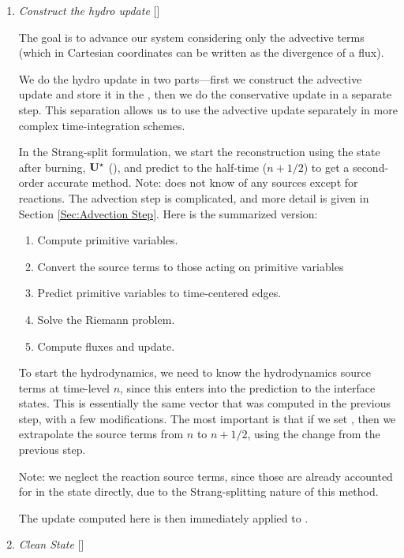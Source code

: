 \begin{enumerate}
\item \label{strang:hydro} {\em Construct the hydro update} []

  The goal is to advance our system considering only the advective
  terms (which in Cartesian coordinates can be written as the
  divergence of a flux).

  We do the hydro update in two parts---first we construct the
  advective update and store it in the 
  \multifab, then we do the conservative update in a separate step.  This
  separation allows us to use the advective update separately in more
  complex time-integration schemes.

  In the Strang-split formulation, we start the reconstruction using
  the state after burning, ${\bf U}^\star$ (), and
  predict to the half-time ($n+1/2$) to get a second-order accurate
  method.  Note:  does not know of any sources
  except for reactions.  The advection step is complicated, and more
  detail is given in Section \ref{Sec:Advection Step}.  Here is the
  summarized version:
  \begin{enumerate}
  \item Compute primitive variables.
  \item Convert the source terms to those acting on primitive variables
  \item Predict primitive variables to time-centered edges.
  \item Solve the Riemann problem.
  \item Compute fluxes and update.
  \end{enumerate}

  To start the hydrodynamics, we need to know the hydrodynamics source
  terms at time-level $n$, since this enters into the prediction to
  the interface states.  This is essentially the same vector that was
  computed in the previous step, with a few modifications.  The most
  important is that if we set
  , then we extrapolate the
  source terms from $n$ to $n+1/2$, using the change from the previous
  step.

  Note: we neglect the reaction source terms, since those are already
  accounted for in the state directly, due to the Strang-splitting
  nature of this method.

  The update computed here is then immediately applied to
  .

\item \label{strang:clean} {\em Clean State} []


\end{enumerate}
